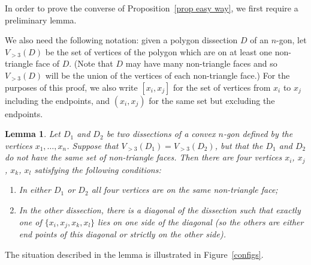 \documentclass[11pt]{article}
\newtheorem{lem}[thm]{Lemma}
\theoremstyle{remark}
\theoremstyle{definition}
\begin{document}
In order to prove the converse of Proposition~\ref{prop easy way}, we first require a preliminary lemma.

We also need the following notation: given a polygon dissection $D$ of an $n$-gon, let $V_{>3}(D)$ be the set of vertices of the polygon which are on at least one non-triangle face of $D$.  (Note that $D$ may have many non-triangle faces and so $V_{>3}(D)$ will be the union of the vertices of each non-triangle face.) For the purposes of this proof, we also write $[x_i,x_j]$ for the set of vertices from $x_i$ to $x_j$ including the endpoints, and $(x_i,x_j)$ for the same set but excluding the endpoints. 

\begin{lem}\label{lem good quads}
Let $D_1$ and $D_2$ be two dissections of a convex $n$-gon defined by the vertices $x_1, \ldots, x_n$.  Suppose that $V_{>3}(D_1) = V_{>3}(D_2)$, but that the $D_1$ and $D_2$ do not have the same set of non-triangle faces.  Then there are four vertices $x_i$, $x_j$, $x_k$, $x_l$ satisfying the following conditions:\begin{enumerate} \item In either $D_1$ or $D_2$ all four vertices are on the same non-triangle face; \item In the other dissection, there is a diagonal of the dissection such that exactly one of $\{x_i, x_j, x_k, x_l\}$ lies on one side of the diagonal (so the others are either end points of this diagonal or strictly on the other side). \end{enumerate}
\end{lem} 

The situation described in the lemma is illustrated in Figure~\ref{configs}.
\end{document}
